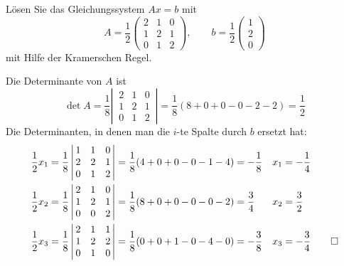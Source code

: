 Lösen Sie das Gleichungssystem $Ax=b$ mit
\[
A=\frac12\begin{pmatrix}2&1&0\\1&2&1\\0&1&2\end{pmatrix},\qquad
b=\frac12\begin{pmatrix}1\\2\\0\end{pmatrix}
\]
mit Hilfe der Kramerschen Regel.


\begin{loesung}
Die Determinante von $A$ ist
\[
\operatorname{det}A
=
\frac18
\left|\,\begin{matrix}2&1&0\\1&2&1\\0&1&2\end{matrix}\,\right|
=\frac18(8+0+0-0-2-2)=\frac12
\]
Die Determinanten, in denen man die $i$-te Spalte durch $b$ ersetzt hat:
\begin{align*}
\frac12 x_1&=
\frac18\left|\,\begin{matrix}
1&1&0\\
2&2&1\\
0&1&2\end{matrix}\,\right|
=\frac18(4+0+0-0-1-4)=-\frac18
&x_1&=-\frac14
\\
\frac12 x_2&=
\frac18\left|\,\begin{matrix}
2&1&0\\
1&2&1\\
0&0&2\end{matrix}\,\right|
=\frac18(8+0+0-0-0-2)=\frac34
&x_2&=\frac32
\\
\frac12 x_3&=
\frac18\left|\,\begin{matrix}
2&1&1\\
1&2&2\\
0&1&0\end{matrix}\,\right|
=\frac18(0+0+1-0-4-0)=-\frac38
&x_3&=-\frac34
\qedhere
\end{align*}
\end{loesung}


